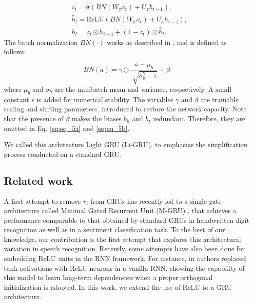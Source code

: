\documentclass[journal]{IEEEtran}
\begin{document}
\begin{subequations}
\begin{align}
\label{eq:eq_5a}&z_{t}=\sigma(BN(W_{z}x_{t})+U_{z}h_{t-1}), \\
\label{eq:eq_5b}&\widetilde{h_{t}}=\mbox{ReLU}(BN(W_{h}x_{t})+U_{h}h_{t-1}), \\
\label{eq:eq_5c}&h_{t}=z_{t} \odot h_{t-1}+ (1-z_{t}) \odot \widetilde{h_{t}}.
\end{align}
\end{subequations}
The batch normalization $BN(\cdot)$ works as described in \cite{batchnorm}, and is defined as follows:

\begin{equation}
BN(a)=\gamma \odot
\label{eq:bn} \frac{a-\mu_b}{\sqrt[]{\sigma_b^2+\epsilon}}+\beta
\end{equation}
where $\mu_b$ and $\sigma_b$ are the minibatch mean and variance, respectively. A small constant $\epsilon$ is added for numerical stability. The variables $\gamma$ and $\beta$ are trainable scaling and shifting parameters, introduced to restore the network capacity. Note that the presence of $\beta$ makes the biases $b_h$ and $b_z$ redundant. Therefore, they are omitted in Eq. \ref{eq:eq_5a} and \ref{eq:eq_5b}.


We called this architecture Light GRU (Li-GRU), to emphasize the simplification process conducted on a standard GRU.


\subsection{Related work} \label{sec:related_work}
A first attempt to remove $r_{t}$ from GRUs has recently led to a single-gate architecture called Minimal Gated Recurrent Unit (M-GRU) \cite{mgru}, that achieves a performance comparable to that obtained by standard GRUs in handwritten digit recognition as well as in a sentiment classification task.  To the best of our knowledge, our contribution is the first attempt that explores this architectural variation in speech recognition.  Recently, some attempts have also been done for embedding ReLU units in the RNN framework. For instance, in \cite{orth_init} authors replaced tanh activations with ReLU neurons in a vanilla RNN, showing the capability of this model to learn long-term dependencies when a proper orthogonal initialization is adopted. In this work, we extend the use of ReLU to a GRU architecture.
\end{document}
